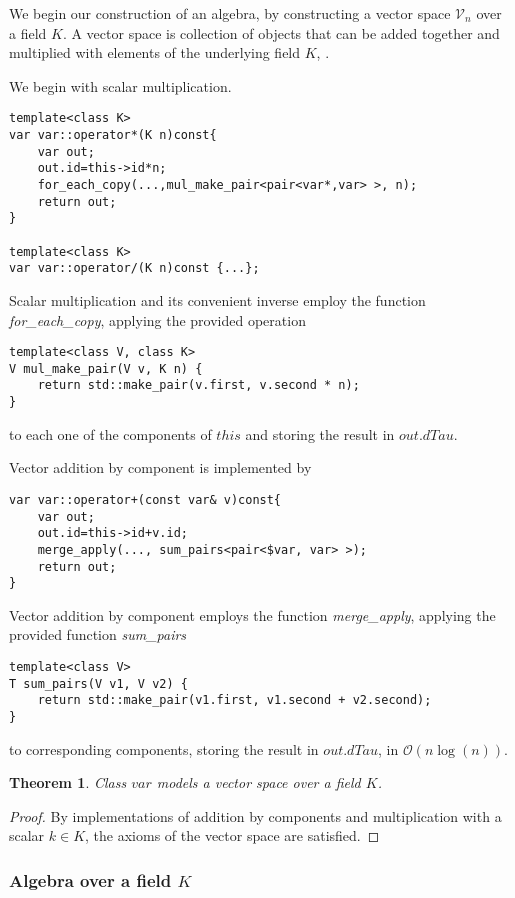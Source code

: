 \documentclass{article}
\newcommand{\VV}{\mathcal{V}}
\newtheorem{izrek}{Theorem}[section]
\begin{document}
We begin our construction of an algebra, by constructing a vector space $\VV_n$ over a field $K$. A vector space is collection of objects that can be added together and multiplied with elements of the underlying field $K$, .

We begin with scalar multiplication.

\begin{lstlisting}
template<class K>
var var::operator*(K n)const{
    var out;
    out.id=this->id*n;
    for_each_copy(...,mul_make_pair<pair<var*,var> >, n);
    return out;
}

template<class K>
var var::operator/(K n)const {...};
\end{lstlisting}
Scalar multiplication and its convenient inverse employ the function \emph{for\_each\_copy}, applying the provided operation 
\begin{lstlisting}
template<class V, class K>
V mul_make_pair(V v, K n) {
    return std::make_pair(v.first, v.second * n);
}
\end{lstlisting}
to each one of the components of $this$ and storing the result in $out.dTau$.

Vector addition by component is implemented by 
\begin{lstlisting}
var var::operator+(const var& v)const{
    var out;
    out.id=this->id+v.id;
    merge_apply(..., sum_pairs<pair<$var, var> >);
    return out;
}
\end{lstlisting}
Vector addition by component employs the function \emph{merge\_apply}, applying the provided function \emph{sum\_pairs}
\begin{lstlisting}
template<class V>
T sum_pairs(V v1, V v2) {
    return std::make_pair(v1.first, v1.second + v2.second);
}
\end{lstlisting}
to corresponding components, storing the result in $out.dTau$, in $\mathcal{O}(n\log(n))$.

\begin{izrek}
Class $var$ models a vector space over a field $K$.
\end{izrek}
\begin{proof}
By implementations of addition by components and multiplication with a scalar $k\in K$, the axioms of the vector space are satisfied.
\end{proof}

\subsubsection{Algebra over a field $K$}
\end{document}
